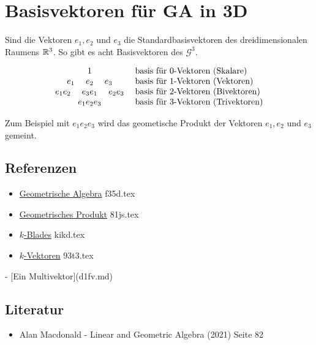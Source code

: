 \documentclass{sajzk}
\begin{document}
\section{Basisvektoren für GA in 3D}
\label{fw8i}

Sind die Vektoren $e_1, e_2$ und $e_3$ die Standardbasisvektoren des
dreidimensionalen Raumens $\mathbb{R}^3$. So gibt es acht Basisvektoren des
$\mathscr{G}^3$.

\[
\begin{matrix}
    1 \\ 
    e_1\hspace{3ex} e_2\hspace{3ex} e_3 \\ 
    e_1e_2\hspace{3ex} e_3e_1\hspace{3ex} e_2e_3 \\
    e_1e_2e_3
\end{matrix}
\hspace{3ex}
\begin{matrix*}[l]
    \textrm{basis für }0\textrm{-Vektoren (Skalare)} \\ 
    \textrm{basis für }1\textrm{-Vektoren (Vektoren)} \\ 
    \textrm{basis für }2\textrm{-Vektoren (Bivektoren)} \\ 
    \textrm{basis für }3\textrm{-Vektoren (Trivektoren)} \\ 
\end{matrix*}
\]

Zum Beispiel mit $e_1e_2e_3$ wird das geometische Produkt der Vektoren $e_1, e_2$
und $e_3$ gemeint.

\subsection{Referenzen}
\begin{itemize}
    \item \href{f35d.pdf}{Geometrische Algebra} f35d.tex
    \item \href{81js.pdf}{Geometrisches Produkt} 81js.tex
    \item \href{kikd.pdf}{$k$-Blades} kikd.tex
    \item \href{93t3.pdf}{$k$-Vektoren} 93t3.tex
\end{itemize}

- [Ein Multivektor](d1fv.md)

\subsection{Literatur}
\begin{itemize}
    \item Alan Macdonald - Linear and Geometric Algebra (2021) Seite 82
\end{itemize}
\end{document}
